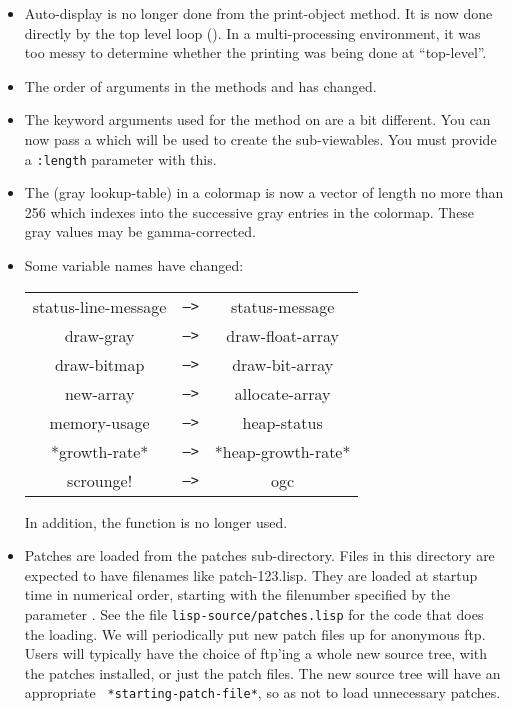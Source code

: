 \begin{itemize}
\item Auto-display is no longer done from the print-object method.  It
is now done directly by the top level loop ().  In a
multi-processing environment, it was too messy to determine whether
the printing was being done at ``top-level''.

\item The order of arguments in the methods  and
 has changed.

\item The keyword arguments used for the  method on
 are a bit different.  You can now pass a
 which will be used to create the sub-viewables.
You must provide a {\tt :length} parameter with this.  

\item The  (gray lookup-table) in a colormap is now a vector of
length no more than 256 which indexes into the successive gray entries
in the colormap.  These gray values may be gamma-corrected.

\item Some variable names have changed:

\begin{tabular}{ccc}
status-line-message & {\tt -->} & status-message \\
draw-gray           & {\tt -->} & draw-float-array \\
draw-bitmap	    & {\tt -->} & draw-bit-array \\
new-array           & {\tt -->} & allocate-array \\
memory-usage        & {\tt -->} & heap-status \\
*growth-rate* 	    & {\tt -->} & *heap-growth-rate* \\
scrounge!           & {\tt -->} & ogc \\
\end{tabular}

In addition, the function  is no longer used.

\item Patches are loaded from the patches sub-directory.  Files in
this directory are expected to have filenames like patch-123.lisp.
They are loaded at startup time in numerical order, starting with the
filenumber specified by the parameter .
See the file {\tt lisp-source/patches.lisp} for the code that does the
loading.  We will periodically put new patch files up for anonymous
ftp.  Users will typically have the choice of ftp'ing a whole new
source tree, with the patches installed, or just the patch  files.
The new source tree will have an appropriate {\tt
*starting-patch-file*}, so as not to load unnecessary patches.

\end{itemize}

